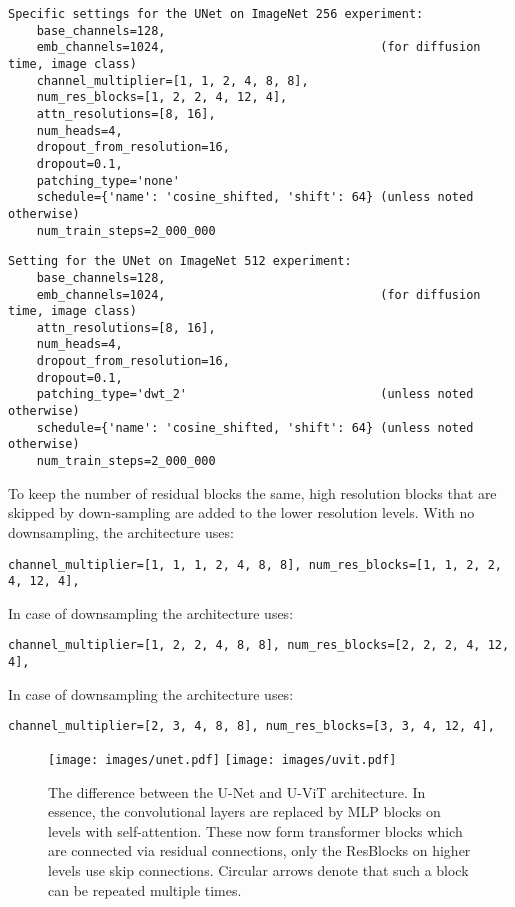 \documentclass[nohyperref]{article}
\theoremstyle{plain}
\theoremstyle{definition}
\theoremstyle{remark}
\begin{document}
\begin{lstlisting}
Specific settings for the UNet on ImageNet 256 experiment:
    base_channels=128,
    emb_channels=1024,                              (for diffusion time, image class)
    channel_multiplier=[1, 1, 2, 4, 8, 8],
    num_res_blocks=[1, 2, 2, 4, 12, 4],
    attn_resolutions=[8, 16],
    num_heads=4,
    dropout_from_resolution=16,
    dropout=0.1,
    patching_type='none'
    schedule={'name': 'cosine_shifted, 'shift': 64} (unless noted otherwise)
    num_train_steps=2_000_000
\end{lstlisting}


\begin{lstlisting}
Setting for the UNet on ImageNet 512 experiment:
    base_channels=128,
    emb_channels=1024,                              (for diffusion time, image class)
    attn_resolutions=[8, 16],
    num_heads=4,
    dropout_from_resolution=16,
    dropout=0.1,
    patching_type='dwt_2'                           (unless noted otherwise)
    schedule={'name': 'cosine_shifted, 'shift': 64} (unless noted otherwise)
    num_train_steps=2_000_000
\end{lstlisting}
To keep the number of residual blocks the same, high resolution blocks that are skipped by down-sampling are added to the lower resolution levels. With no downsampling, the architecture uses:
\begin{lstlisting}
channel_multiplier=[1, 1, 1, 2, 4, 8, 8], num_res_blocks=[1, 1, 2, 2, 4, 12, 4],
\end{lstlisting}
In case of  downsampling the architecture uses:
\begin{lstlisting}
channel_multiplier=[1, 2, 2, 4, 8, 8], num_res_blocks=[2, 2, 2, 4, 12, 4],
\end{lstlisting}
In case of  downsampling the architecture uses:
\begin{lstlisting}
channel_multiplier=[2, 3, 4, 8, 8], num_res_blocks=[3, 3, 4, 12, 4],
\end{lstlisting}



\begin{figure}
    \centering
    \texttt{[image: images/unet.pdf]} \vspace{.05cm}
    \texttt{[image: images/uvit.pdf]}
    \caption{The difference between the U-Net and U-ViT architecture. In essence, the convolutional layers are replaced by MLP blocks on levels with self-attention. These now form transformer blocks which are connected via residual connections, only the ResBlocks on higher levels use skip connections. Circular arrows denote that such a block can be repeated multiple times.}
    \label{fig:unet_vs_uvit}
\end{figure}
\end{document}
